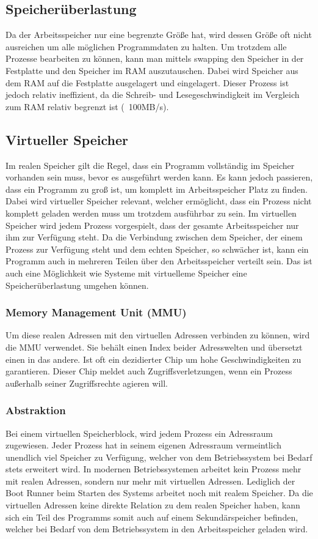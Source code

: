 \documentclass{article}
\begin{document}
	\subsection{Speicherüberlastung}
	Da der Arbeitsspeicher nur eine begrenzte Größe hat, wird dessen Größe oft nicht ausreichen um alle möglichen Programmdaten zu halten. Um trotzdem alle Prozesse bearbeiten zu können, kann man mittels swapping den Speicher in der Festplatte und den Speicher im RAM auszutauschen. Dabei wird Speicher aus dem RAM auf die Festplatte ausgelagert und eingelagert. Dieser Prozess ist jedoch relativ ineffizient, da die Schreib- und Lesegeschwindigkeit im Vergleich zum RAM relativ begrenzt ist (~{}100MB/s).
	\subsection{Virtueller Speicher}
	Im realen Speicher gilt die Regel, dass ein Programm vollständig im Speicher vorhanden sein muss, bevor es ausgeführt werden kann. Es kann jedoch passieren, dass ein Programm zu groß ist, um komplett im Arbeitsspeicher Platz zu finden. Dabei wird virtueller Speicher relevant, welcher ermöglicht, dass ein Prozess nicht komplett geladen werden muss um trotzdem ausführbar zu sein. Im virtuellen Speicher wird jedem Prozess vorgespielt, dass der gesamte Arbeitsspeicher nur ihm zur Verfügung steht. Da die Verbindung zwischen dem Speicher, der einem Prozess zur Verfügung steht und dem echten Speicher, so schwächer ist, kann ein Programm auch in mehreren Teilen über den Arbeitsspeicher verteilt sein. Das ist auch eine Möglichkeit wie Systeme mit virtuelleme Speicher eine Speicherüberlastung umgehen können.
	\subsubsection{Memory Management Unit (MMU)}
	Um diese realen Adressen mit den virtuellen Adressen verbinden zu können, wird die MMU verwendet. Sie behält einen Index beider Adresswelten und übersetzt einen in das andere. Ist oft ein dezidierter Chip um hohe Geschwindigkeiten zu garantieren. Dieser Chip meldet auch Zugriffsverletzungen, wenn ein Prozess außerhalb seiner Zugriffsrechte agieren will.
	\subsubsection{Abstraktion}
	Bei einem virtuellen Speicherblock, wird jedem Prozess ein Adressraum zugewiesen. Jeder Prozess hat in seinem eigenen Adressraum vermeintlich unendlich viel Speicher zu Verfügung, welcher von dem Betriebssystem bei Bedarf stets erweitert wird. In modernen Betriebssystemen arbeitet kein Prozess mehr mit realen Adressen, sondern nur mehr mit virtuellen Adressen. Lediglich der Boot Runner beim Starten des Systems arbeitet noch mit realem Speicher. Da die virtuellen Adressen keine direkte Relation zu dem realen Speicher haben, kann sich ein Teil des Programms somit auch auf einem Sekundärspeicher befinden, welcher bei Bedarf von dem Betriebssystem in den Arbeitsspeicher geladen wird.
\end{document}
